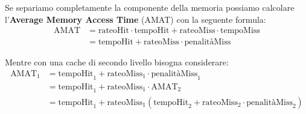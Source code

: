 \noindent Se separiamo completamente la componente della memoria possiamo calcolare l'\textbf{Average Memory Access Time} (AMAT) con la seguente
formula: \begin{equation}
    \begin{split}
        \text{AMAT} &= \text{rateoHit}\cdot \text{tempoHit} + \text{rateoMiss}\cdot \text{tempoMiss}\\
            &= \text{tempoHit} + \text{rateoMiss}\cdot \text{penalitàMiss}
    \end{split}
\end{equation}

\noindent Mentre con una cache di secondo livello bisogna considerare: \begin{equation}
    \begin{split}
        \text{AMAT}_1 &= \text{tempoHit}_1 + \text{rateoMiss}_1\cdot \text{penalitàMiss}_1\\
            &= \text{tempoHit}_1 + \text{rateoMiss}_1\cdot \text{AMAT}_2\\
            &= \text{tempoHit}_1 + \text{rateoMiss}_1(\text{tempoHit}_2 + \text{rateoMiss}_2\cdot \text{penalitàMiss}_2)
    \end{split}
\end{equation}


